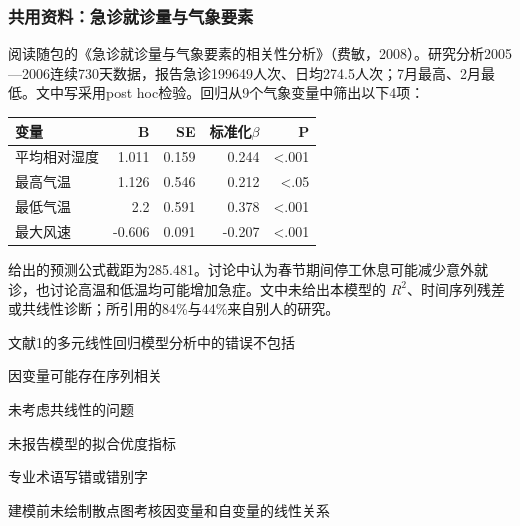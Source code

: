 \subsubsection*{共用资料：急诊就诊量与气象要素}

阅读随包的《急诊就诊量与气象要素的相关性分析》（费敏，2008）。研究分析2005---2006连续730天数据，报告急诊199649人次、日均274.5人次；7月最高、2月最低。文中写采用post hoc检验。回归从9个气象变量中筛出以下4项：

\begin{center}\small\setlength{\tabcolsep}{3.5pt}\renewcommand{\arraystretch}{1.18}\begin{tabular}{@{}lrrrr@{}}
\toprule
变量 & B & SE & 标准化\(\beta\) & P \\
\midrule

平均相对湿度 & 1.011 & 0.159 & 0.244 & \textless.001 \\
最高气温 & 1.126 & 0.546 & 0.212 & \textless.05 \\
最低气温 & 2.2 & 0.591 & 0.378 & \textless.001 \\
最大风速 & -0.606 & 0.091 & -0.207 & \textless.001 \\
\bottomrule\end{tabular}\end{center}

给出的预测公式截距为285.481。讨论中认为春节期间停工休息可能减少意外就诊，也讨论高温和低温均可能增加急症。文中未给出本模型的 \(R^2\)、时间序列残差或共线性诊断；所引用的84\%与44\%来自别人的研究。


\par\addvspace{6pt}\noindent\begin{minipage}{\linewidth}


文献1的多元线性回归模型分析中的错误不包括


\begin{choices}

\item 因变量可能存在序列相关

\item 未考虑共线性的问题

\item 未报告模型的拟合优度指标

\item 专业术语写错或错别字

\item 建模前未绘制散点图考核因变量和自变量的线性关系

\end{choices}

\end{minipage}\par\vspace{4pt}

